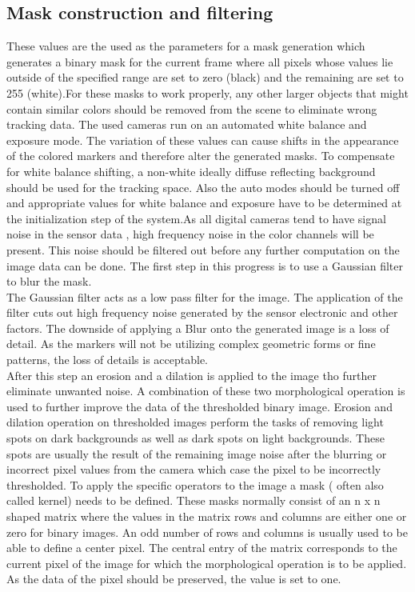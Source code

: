 \subsection{Mask construction and filtering}
These values are the used as the parameters for a mask generation which generates a binary mask for the current frame where all pixels whose values lie outside of the specified range are set to zero (black) and the remaining are set to 255 (white).For these masks to work properly, any other larger objects that might contain similar colors should be removed from the scene to eliminate wrong tracking data. The used cameras run on an automated white balance and exposure mode. The variation of these values can cause shifts in the appearance of the colored markers and therefore alter the generated masks. To compensate for white balance shifting, a non-white ideally diffuse reflecting background should be used for the tracking space. Also the auto modes should be turned off and appropriate values for white balance and exposure have to be determined at the initialization step of the system.As all digital cameras tend to have signal noise in the sensor data , high frequency  noise in the color channels will be present. This noise should be filtered out before any further computation on the image data can be done.
The first step in this progress is to use a Gaussian filter to blur the mask.\\
The Gaussian filter acts as a low pass filter for the image. The application of the filter cuts out high frequency noise generated by the sensor electronic and other factors. The downside of applying a Blur onto the generated image is a loss of detail. As the markers will not be utilizing complex geometric forms or fine patterns, the loss of details is acceptable.\\
After this step an erosion and a dilation is applied to the image tho further eliminate unwanted noise. A combination of these two morphological operation is used to further improve the data of the thresholded binary image\cite[chapter~3.11-12]{Davies.2017}.
Erosion and dilation operation on thresholded images perform the tasks of removing light spots on dark backgrounds as well as dark spots on light backgrounds. These spots are usually the result of the remaining image noise after the blurring or incorrect pixel values from the camera which case the pixel to be incorrectly thresholded.
To apply the specific operators to the image a mask ( often also called kernel) needs to be defined. These masks normally consist of an n x n shaped matrix where the values in the matrix rows and columns are either one or zero for binary images. An odd number of rows and columns is usually used to be able to define a center pixel. The central entry of the matrix corresponds to the current pixel of the image for which the morphological operation is to be applied. As the data of the pixel should be preserved, the value is set to one. 
